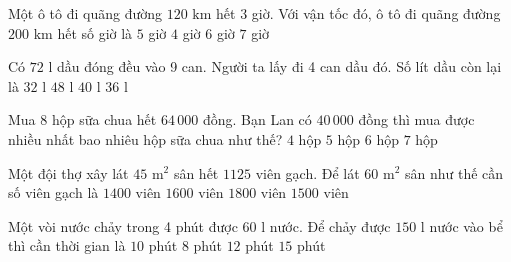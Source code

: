 \begin{ex} %
Một ô tô đi quãng đường $120\text{ km}$ hết $3$ giờ. Với vận tốc đó, ô tô đi quãng đường $200\text{ km}$ hết số giờ là
\choice
{\True $5$ giờ}
{$4$ giờ}
{$6$ giờ}
{$7$ giờ}
\end{ex}

\begin{ex} %
Có $72\text{ l}$ dầu đóng đều vào 9 can. Người ta lấy đi 4 can dầu đó. Số lít dầu còn lại là
\choice
{$32\text{ l}$}
{$48\text{ l}$}
{\True $40\text{ l}$}
{$36\text{ l}$}
\end{ex}

\begin{ex} %
Mua 8 hộp sữa chua hết $64\,000$ đồng. Bạn Lan có $40\,000$ đồng thì mua được nhiều nhất bao nhiêu hộp sữa chua như thế?
\choice
{$4$ hộp}
{\True $5$ hộp}
{$6$ hộp}
{$7$ hộp}
\end{ex}

\begin{ex} %
Một đội thợ xây lát $45\text{ m}^2$ sân hết $1125$ viên gạch. Để lát $60\text{ m}^2$ sân như thế cần số viên gạch là
\choice
{$1400$ viên}
{$1600$ viên}
{$1800$ viên}
{\True $1500$ viên}
\end{ex}

\begin{ex} %
Một vòi nước chảy trong 4 phút được $60\text{ l}$ nước. Để chảy được $150\text{ l}$ nước vào bể thì cần thời gian là
\choice
{\True $10$ phút}
{$8$ phút}
{$12$ phút}
{$15$ phút}
\end{ex}

